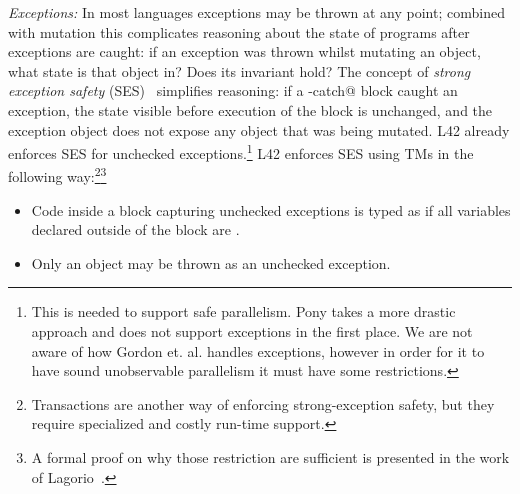 \textit{Exceptions:}
In most languages exceptions may be thrown at any point; combined with mutation this complicates reasoning about the state of programs after exceptions are caught: if an exception was thrown whilst mutating an object, what state is that object in? Does its invariant hold?
The concept of \emph{strong exception safety} (SES)~\cite{Abrahams2000,JOT:issue_2011_01/article1} simplifies reasoning:
if a \Q@try-catch@ block caught an exception, the state visible before execution of the \Q@try@ block is unchanged, and the exception object does not expose any object that was being mutated.
L42 already enforces SES for unchecked exceptions.\footnote{
This is needed to support safe parallelism. Pony takes a more drastic approach and does not support exceptions in the first place. 
We are not aware of how Gordon et. al. handles exceptions, however in order for it to have sound unobservable parallelism it must have some restrictions.
}
L42 enforces SES using TMs in the following way:\footnote{Transactions are another way of enforcing strong-exception safety, but they require specialized and costly run-time support.}\footnote{A formal proof on why those restriction are sufficient is presented in the work of Lagorio~\cite{JOT:issue_2011_01/article1}.}
\begin{itemize}
\item Code inside a \Q@try@ block capturing unchecked exceptions is typed as if all \Q@mut@ variables declared outside of the block are \Q@read@.
\item Only an \Q@imm@ object may be thrown as an unchecked exception.
\end{itemize} 

